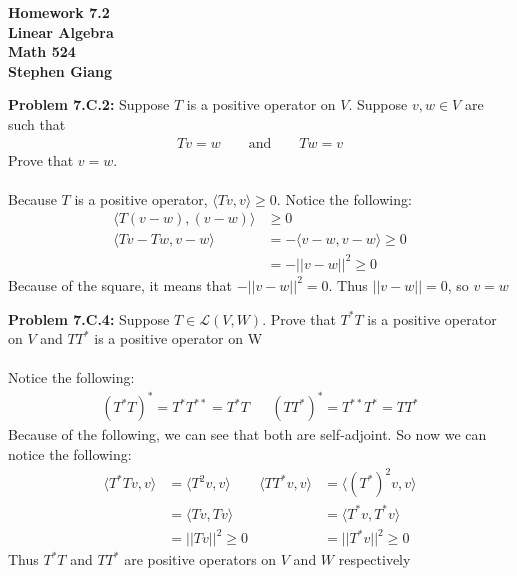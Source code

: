 \documentclass[12pt]{article}
\begin{document}
	
	\begin{center}
		\textbf{Homework 7.2} \\
		\textbf{Linear Algebra} \\
		\textbf{Math 524} \\
		\textbf{Stephen Giang} \\
	\end{center}

\noindent \textbf{Problem 7.C.2: }Suppose $T$ is a positive operator on $V$. Suppose $v,w \in V$ are such that
	\begin{align*}
		Tv = w \qquad \text{and} \qquad Tw = v
	\end{align*}
Prove that $v = w$.
\\ \\
Because $T$ is a positive operator, $\langle Tv, v\rangle \geq 0$. Notice the following:
	\begin{align*}
		\langle T(v -w), (v-w) \rangle &\geq 0 \\
		\langle Tv - Tw, v - w \rangle &= - \langle v - w, v - w \rangle \geq 0 \\
		&= - || v - w ||^2 \geq 0
	\end{align*}
Because of the square, it means that $- || v - w ||^2 = 0 $.  Thus $|| v - w || = 0$, so $v = w$

\newpage 

\noindent \textbf{Problem 7.C.4: }Suppose $T \in \mathcal{L}(V,W)$. Prove that $T^*T$ is a positive operator on $V$ and $TT^*$ is a positive operator on W
\\ \\
Notice the following:
	\begin{align*}
		(T^*T)^* = T^*T^{**} = T^*T	&&	(TT^*)^* = T^{**}T^* = TT^*
	\end{align*}
Because of the following, we can see that both are self-adjoint. So now we can notice the following:
	\begin{align*}
		\langle T^*Tv, v \rangle &= \langle T^2v,v \rangle & 
		\langle TT^*v, v \rangle &= \langle (T^*)^2v,v \rangle \\
		&= \langle Tv,Tv \rangle & &= \langle T^*v,T^*v \rangle \\
		&= || Tv ||^2 \geq 0 & 	&=  || T^*v ||^2 \geq 0
	\end{align*}
Thus $T^*T$ and $TT^*$ are positive operators on $V$ and $W$ respectively

\newpage 
\end{document}
